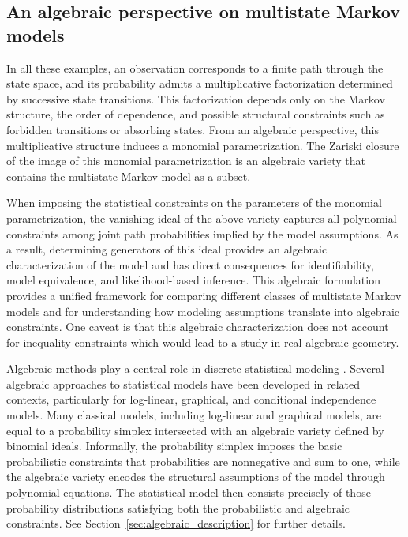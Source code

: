 \documentclass[11pt, a4paper]{article}
\numberwithin{equation}{section}
\theoremstyle{plain}
\theoremstyle{definition}
\begin{document}
\subsection{An algebraic perspective on multistate Markov models}

In all these examples, an observation corresponds to a finite path through the state space, and its
probability admits a multiplicative factorization determined by successive state transitions. This
factorization depends only on the Markov structure, the order of dependence, and possible structural
constraints such as forbidden transitions or absorbing states. From an algebraic perspective, this multiplicative structure induces a monomial parametrization. 
The Zariski closure of the image of this monomial parametrization is an algebraic variety that contains the multistate Markov model as a subset.


When imposing the statistical constraints on the parameters of the monomial parametrization, the vanishing ideal of the above variety captures all polynomial constraints among joint path probabilities implied by the model assumptions. As a result, determining generators of this ideal provides an algebraic characterization of the model and has direct consequences for identifiability, model equivalence, and likelihood-based inference.
This algebraic formulation provides a unified framework for comparing different classes of multistate Markov models and for understanding how modeling assumptions translate into algebraic constraints. One caveat is that this algebraic characterization does not account for inequality constraints which would lead to a study in real algebraic geometry. 


Algebraic methods play a
central role in discrete statistical modeling
\cite{pistone2001algebraic,drton-sturmfels-sullivant,sullivant2023algebraic}.
Several algebraic approaches to statistical models have been developed in related contexts,
particularly for log-linear, graphical, and conditional independence models.
Many classical models, including log-linear
and graphical models, are equal to a probability simplex intersected with an algebraic variety defined by binomial ideals.
Informally, the probability simplex imposes the basic probabilistic constraints that probabilities are nonnegative and sum to one, while the algebraic variety encodes the structural assumptions of the model through polynomial equations. The statistical model then consists precisely of those probability distributions satisfying both the probabilistic and algebraic constraints. See Section~\ref{sec:algebraic_description} for further details.
\end{document}
